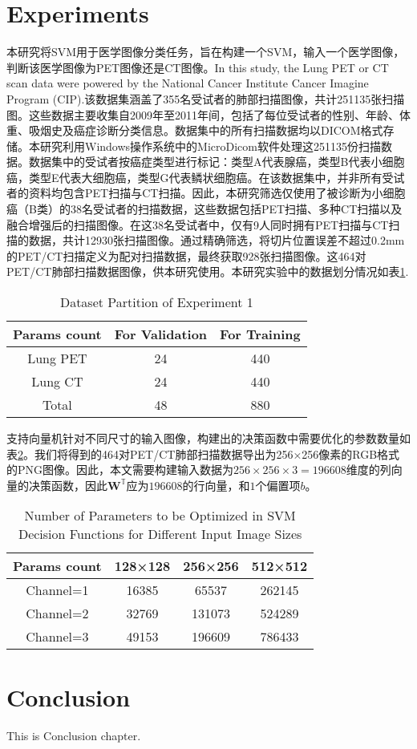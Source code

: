 \documentclass[twocolumn]{article}
\begin{document}
\section{Experiments}
本研究将SVM用于医学图像分类任务，旨在构建一个SVM，输入一个医学图像，判断该医学图像为PET图像还是CT图像。In this study, the Lung PET or CT scan data\cite{li_large-scale_2020} were powered by the National Cancer Institute Cancer Imagine Program (CIP).该数据集涵盖了355名受试者的肺部扫描图像，共计251135张扫描图。这些数据主要收集自2009年至2011年间，包括了每位受试者的性别、年龄、体重、吸烟史及癌症诊断分类信息。数据集中的所有扫描数据均以DICOM格式存储。本研究利用Windows操作系统中的MicroDicom软件处理这251135份扫描数据。数据集中的受试者按癌症类型进行标记：类型A代表腺癌，类型B代表小细胞癌，类型E代表大细胞癌，类型G代表鳞状细胞癌。在该数据集中，并非所有受试者的资料均包含PET扫描与CT扫描。因此，本研究筛选仅使用了被诊断为小细胞癌（B类）的38名受试者的扫描数据，这些数据包括PET扫描、多种CT扫描以及融合增强后的扫描图像。在这38名受试者中，仅有9人同时拥有PET扫描与CT扫描的数据，共计12930张扫描图像。通过精确筛选，将切片位置误差不超过0.2mm的PET/CT扫描定义为配对扫描数据，最终获取928张扫描图像。这464对PET/CT肺部扫描数据图像，供本研究使用。本研究实验中的数据划分情况如表\ref{tab:dataset_partition_1}.

\begin{table}[h]
	\centering
	\caption{Dataset Partition of Experiment 1}
	\label{tab:dataset_partition_1}
	\begin{tabular}{ccc}
		\toprule
		Params count & For Validation & For Training \\
		\midrule
		Lung PET & 24   & 440 \\
		Lung CT  & 24   & 440 \\
		Total    & 48   & 880 \\
		\bottomrule
	\end{tabular}
\end{table}

支持向量机针对不同尺寸的输入图像，构建出的决策函数中需要优化的参数数量如表\ref{tab:params_count}。我们将得到的464对PET/CT肺部扫描数据导出为256×256像素的RGB格式的PNG图像。因此，本文需要构建输入数据为$256 \times 256 \times 3=196608$维度的列向量的决策函数，因此$\mathbf{W}^\mathbb{T}$应为$196608$的行向量，和$1$个偏置项$b$。

\begin{table}[h]
	\centering
	\caption{Number of Parameters to be Optimized in SVM Decision Functions for Different Input Image Sizes}
	\label{tab:params_count}
	\begin{tabular}{cccc}
		\toprule
		Params count & 128×128 & 256×256 & 512×512 \\
		\midrule
		Channel=1    & 16385   & 65537   & 262145  \\
		Channel=2    & 32769   & 131073  & 524289  \\
		Channel=3    & 49153   & 196609  & 786433  \\
		\bottomrule
	\end{tabular}
\end{table}







\section{Conclusion}
This is Conclusion chapter.



\end{document}
